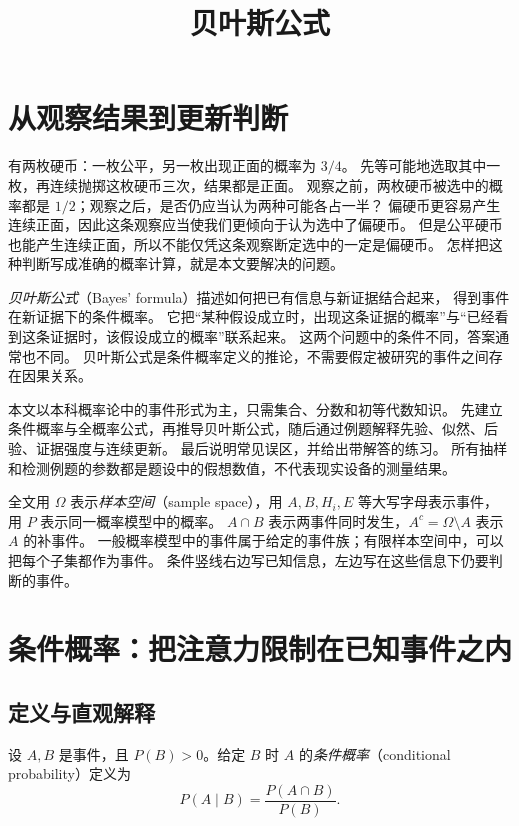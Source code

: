 \documentclass[UTF8,12pt,a4paper,fontset=fandol]{ctexart}
\title{贝叶斯公式}
\author{}
\date{}
\begin{document}
\maketitle
\tableofcontents

\section{从观察结果到更新判断}
\label{sec:bayes-introduction}

有两枚硬币：一枚公平，另一枚出现正面的概率为 $3/4$。
先等可能地选取其中一枚，再连续抛掷这枚硬币三次，结果都是正面。
观察之前，两枚硬币被选中的概率都是 $1/2$；观察之后，是否仍应当认为两种可能各占一半？
偏硬币更容易产生连续正面，因此这条观察应当使我们更倾向于认为选中了偏硬币。
但是公平硬币也能产生连续正面，所以不能仅凭这条观察断定选中的一定是偏硬币。
怎样把这种判断写成准确的概率计算，就是本文要解决的问题。

\emph{贝叶斯公式}（Bayes' formula）描述如何把已有信息与新证据结合起来，
得到事件在新证据下的条件概率。
它把“某种假设成立时，出现这条证据的概率”与“已经看到这条证据时，该假设成立的概率”联系起来。
这两个问题中的条件不同，答案通常也不同。
贝叶斯公式是条件概率定义的推论，不需要假定被研究的事件之间存在因果关系。

本文以本科概率论中的事件形式为主，只需集合、分数和初等代数知识。
先建立条件概率与全概率公式，再推导贝叶斯公式，随后通过例题解释先验、似然、后验、证据强度与连续更新。
最后说明常见误区，并给出带解答的练习。
所有抽样和检测例题的参数都是题设中的假想数值，不代表现实设备的测量结果。

全文用 $\Omega$ 表示\emph{样本空间}（sample space），用 $A,B,H_i,E$ 等大写字母表示事件，
用 $P$ 表示同一概率模型中的概率。
$A\cap B$ 表示两事件同时发生，$A^c=\Omega\setminus A$ 表示 $A$ 的补事件。
一般概率模型中的事件属于给定的事件族；有限样本空间中，可以把每个子集都作为事件。
条件竖线右边写已知信息，左边写在这些信息下仍要判断的事件。

\section{条件概率：把注意力限制在已知事件之内}
\label{sec:bayes-conditional}

\subsection{定义与直观解释}

\begin{definition}[条件概率]
\label{def:bayes-conditional}
设 $A,B$ 是事件，且 $P(B)>0$。给定 $B$ 时 $A$ 的\emph{条件概率}（conditional probability）定义为
\begin{equation}
  P(A\mid B)=\frac{P(A\cap B)}{P(B)}.
  \label{eq:bayes-conditional}
\end{equation}
\end{definition}
\end{document}
